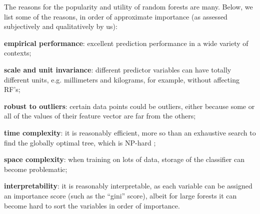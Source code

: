 \documentclass{article} %
\begin{document}
The reasons for the popularity and utility of random forests are many. Below, we list some of the reasons, in order of approximate importance (as assessed subjectively and qualitatively by us):
\begin{compactitem}
\item \textbf{empirical performance}: excellent prediction performance in a wide variety of contexts;
\item \textbf{scale and unit invariance}: different predictor variables can have totally different units, e.g. millimeters and kilograms, for example, without affecting RF's;
\item \textbf{robust to outliers}: certain data points could be outliers, either because some or all of the values of their feature vector are far from the others;
\item \textbf{time complexity}: it is reasonably efficient, more so than an exhaustive search to find the globally optimal tree, which is NP-hard \cite{Heath1993};
\item \textbf{space complexity}: when training on lots of data, storage of the classifier can become problematic;
\item \textbf{interpretability}: it is reasonably interpretable, as each variable can be assigned an importance score (such as the ``gini'' score), albeit for large forests it can become hard to sort the variables in order of importance.
\end{compactitem}
\end{document}

